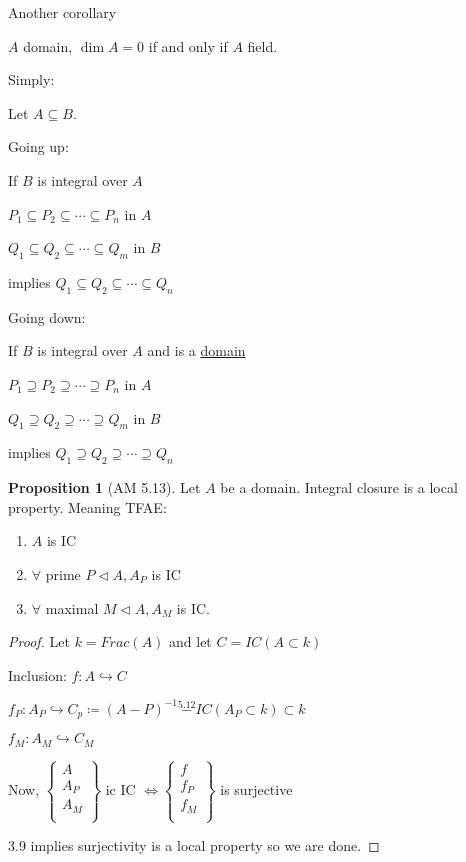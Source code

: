 \documentclass{article}
\theoremstyle{definition}
\newtheorem{proposition}{Proposition}
\begin{document}
Another corollary

\(A\) domain, \(\dim A = 0\) if and only if \(A\) field.

Simply:

Let \(A \subseteq B\).

Going up:

If \(B\) is integral over \(A\) 

\(P_1 \subseteq P_2 \subseteq \cdots \subseteq P_n\) in \(A\) 

\(Q_1 \subseteq Q_2 \subseteq \cdots \subseteq Q_m\) in \(B\) 

implies \(Q_1 \subseteq Q_2 \subseteq \cdots \subseteq Q_n\) 

Going down:

If \(B\) is integral over \(A\) and is a \underline{domain} 

\(P_1 \supseteq P_2 \supseteq \cdots \supseteq P_n\) in \(A\) 

\(Q_1 \supseteq Q_2 \supseteq \cdots \supseteq Q_m\) in \(B\)

implies \(Q_1 \supseteq Q_2 \supseteq \cdots \supseteq Q_n\) 

\begin{proposition}
    [AM 5.13]

    Let \(A\) be a domain. Integral closure is a local property. Meaning TFAE:

    \begin{enumerate}
        [label=\roman*]

        \item \(A\) is IC
        \item \(\forall\) prime \(P \triangleleft A, A_P\) is IC
        \item \(\forall\) maximal \(M \triangleleft A, A_M\) is IC.    
    \end{enumerate}
\end{proposition}

\begin{proof}
    Let \(k = Frac(A)\) and let \(C = IC (A \subset k)\)
    
    Inclusion: \(f:A\hookrightarrow C\)
    
    \(f_P : A_P \hookrightarrow C_p \coloneqq (A-P)^{-1}  \overset{5.12}{-} IC (A_P \subset k) \subset k\) 

    \(f_M : A_M \hookrightarrow C_M\) 

    Now, \(\begin{Bmatrix}
         A \\
         A_P \\
         A_M \\
    \end{Bmatrix}\) ic IC \(\iff \begin{Bmatrix}
         f \\
         f_P \\
         f_M \\
    \end{Bmatrix}\) is surjective  

    3.9 implies surjectivity is a local property so we are done.
\end{proof}
\end{document}
